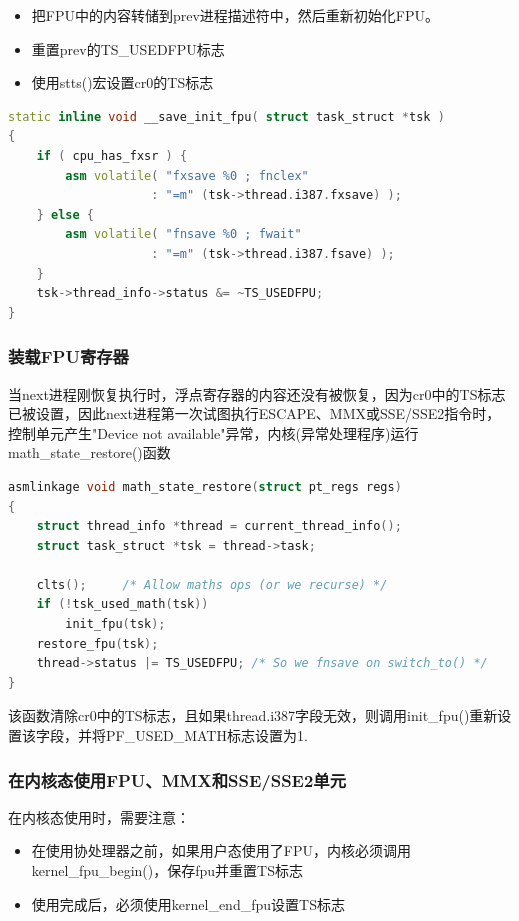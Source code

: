 \begin{itemize}
    \item 把FPU中的内容转储到prev进程描述符中，然后重新初始化FPU。
    \item 重置prev的TS\_USEDFPU标志
    \item 使用stts()宏设置cr0的TS标志
\end{itemize}

\begin{lstlisting}[language=C++]
static inline void __save_init_fpu( struct task_struct *tsk )
{
    if ( cpu_has_fxsr ) {
        asm volatile( "fxsave %0 ; fnclex"
                    : "=m" (tsk->thread.i387.fxsave) );
    } else {
        asm volatile( "fnsave %0 ; fwait"
                    : "=m" (tsk->thread.i387.fsave) );
    }
    tsk->thread_info->status &= ~TS_USEDFPU;
}
\end{lstlisting}

\subsubsection{装载FPU寄存器}

    当next进程刚恢复执行时，浮点寄存器的内容还没有被恢复，因为cr0中的TS标志已被设置，因此next进程第一次试图执行ESCAPE、MMX或SSE/SSE2指令时，控制单元产生"Device not available"异常，内核(异常处理程序)运行math\_state\_restore()函数

\begin{lstlisting}[language=C++]
asmlinkage void math_state_restore(struct pt_regs regs)
{
    struct thread_info *thread = current_thread_info();
    struct task_struct *tsk = thread->task;

    clts();		/* Allow maths ops (or we recurse) */
    if (!tsk_used_math(tsk))
        init_fpu(tsk);
    restore_fpu(tsk);
    thread->status |= TS_USEDFPU; /* So we fnsave on switch_to() */
}
\end{lstlisting}

    该函数清除cr0中的TS标志，且如果thread.i387字段无效，则调用init\_fpu()重新设置该字段，并将PF\_USED\_MATH标志设置为1.

\subsubsection{在内核态使用FPU、MMX和SSE/SSE2单元}

    在内核态使用时，需要注意：

\begin{itemize}
    \item 在使用协处理器之前，如果用户态使用了FPU，内核必须调用kernel\_fpu\_begin()，保存fpu并重置TS标志
    \item 使用完成后，必须使用kernel\_end\_fpu设置TS标志
\end{itemize}

